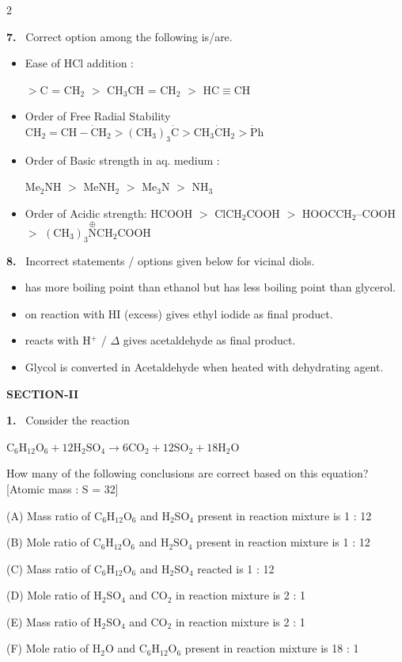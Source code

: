 \documentclass[10pt]{extarticle}
\newcommand{\sect}[1]{\par\smallskip\noindent\textbf{#1}\par}
\newcommand{\qn}[1]{\par\smallskip\noindent\textbf{#1.}~}
\newenvironment{qoptions}{\begin{itemize}[leftmargin=1.8em,itemsep=1pt,topsep=2pt,label={}]}{\end{itemize}}
\newcommand{\opt}[2]{\item[(#1)] #2}
\begin{document}
\begin{multicols}{2}
\qn{7} Correct option among the following is/are.
\begin{qoptions}
\opt{A}{Ease of HCl addition :

$>$C = CH$_2$ $>$ CH$_3$CH = CH$_2$ $>$ HC$\equiv$CH}
\opt{B}{Order of Free Radial Stability\\$\mathrm{CH_2=CH-\dot{C}H_2>(CH_3)_3\dot{C}>CH_3\dot{C}H_2>\dot{P}h}$}
\opt{C}{Order of Basic strength in aq. medium :

Me$_2$NH $>$ MeNH$_2$ $>$ Me$_3$N $>$ NH$_3$}
\opt{D}{Order of Acidic strength: HCOOH $>$ ClCH$_2$COOH $>$ HOOCCH$_2$--COOH $>$ $\mathrm{(CH_3)_3\overset{\oplus}{N}CH_2COOH}$}
\end{qoptions}

\qn{8} Incorrect statements / options given below for vicinal diols.
\begin{qoptions}
\opt{A}{ has more boiling point than ethanol but has less boiling point than glycerol.}
\opt{B}{ on reaction with HI (excess) gives ethyl iodide as final product.}
\opt{C}{ reacts with H$^+$ / $\Delta$ gives acetaldehyde as final product.}
\opt{D}{Glycol is converted in Acetaldehyde when heated with dehydrating agent.}
\end{qoptions}

\sect{SECTION-II}
\qn{1} Consider the reaction

$\mathrm{C_6H_{12}O_6+12H_2SO_4\to6CO_2+12SO_2+18H_2O}$

How many of the following conclusions are correct based on this equation? [Atomic mass : S = 32]

(A) Mass ratio of C$_6$H$_{12}$O$_6$ and H$_2$SO$_4$ present in reaction mixture is 1 : 12

(B) Mole ratio of C$_6$H$_{12}$O$_6$ and H$_2$SO$_4$ present in reaction mixture is 1 : 12

(C) Mass ratio of C$_6$H$_{12}$O$_6$ and H$_2$SO$_4$ reacted is 1 : 12

(D) Mole ratio of H$_2$SO$_4$ and CO$_2$ in reaction mixture is 2 : 1

(E) Mass ratio of H$_2$SO$_4$ and CO$_2$ in reaction mixture is 2 : 1

(F) Mole ratio of H$_2$O and C$_6$H$_{12}$O$_6$ present in reaction mixture is 18 : 1


\end{multicols}
\end{document}
